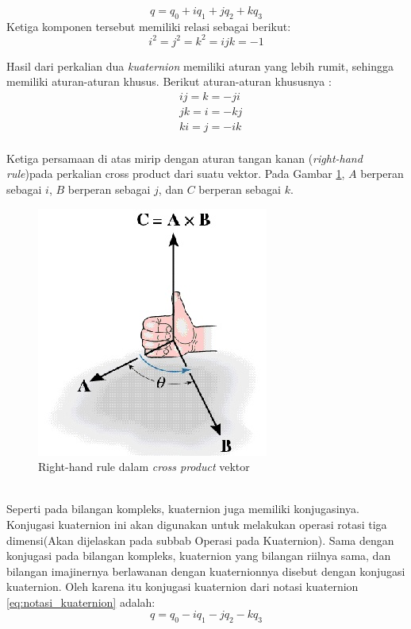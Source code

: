 \begin{equation}
	q = q_0 + i q_1 + j q_2 + k q_3	
\label{eq:notasi_kuaternion}
\end{equation}
Ketiga komponen tersebut memiliki relasi sebagai berikut:
\[
	i^2 = j^2 = k^2 = ijk = -1
\]

Hasil dari perkalian dua \textit{kuaternion} memiliki aturan yang lebih rumit, sehingga memiliki aturan-aturan khusus. Berikut aturan-aturan khususnya :
\begin{equation}
	\begin{split}
	& ij = k = -ji\\
	& jk = i = -kj\\
	& ki = j = -ik	
	\end{split}
\label{eq:persamaan_khusus_aturan_quaternion}
\end{equation}\\
Ketiga persamaan di atas mirip dengan aturan tangan kanan (\textit{right-hand rule})pada perkalian cross product dari suatu vektor. Pada Gambar \ref{fig:right-hand-rule}, \(A\) berperan sebagai \(i\), \(B\) berperan sebagai \(j\), dan \(C\) berperan sebagai \(k\).\\
\begin{figure}[htbp]
\centering
\includegraphics[scale=1]{Gambar/right-hand-rule}
\caption{Right-hand rule dalam \textit{cross product} vektor} 
\label{fig:right-hand-rule}
\end{figure}\\

Seperti pada bilangan kompleks, kuaternion juga memiliki konjugasinya. Konjugasi kuaternion ini akan digunakan untuk melakukan operasi rotasi tiga dimensi(Akan dijelaskan pada subbab Operasi pada Kuaternion). Sama dengan konjugasi pada bilangan kompleks, kuaternion yang bilangan riilnya sama, dan bilangan imajinernya berlawanan dengan kuaternionnya disebut dengan konjugasi kuaternion. Oleh karena itu konjugasi kuaternion dari notasi kuaternion \ref{eq:notasi_kuaternion} adalah: 
\[
	q = q_0 - i q_1 - j q_2 - k q_3
\]

